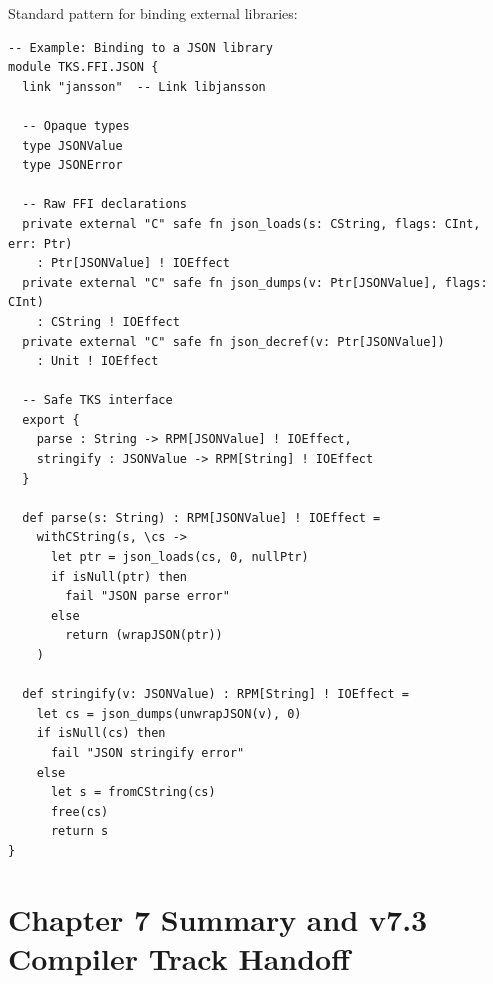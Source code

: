 \begin{definition}
\label{def:lib-binding-pattern}
Standard pattern for binding external libraries:
\begin{verbatim}
-- Example: Binding to a JSON library
module TKS.FFI.JSON {
  link "jansson"  -- Link libjansson

  -- Opaque types
  type JSONValue
  type JSONError

  -- Raw FFI declarations
  private external "C" safe fn json_loads(s: CString, flags: CInt, err: Ptr)
    : Ptr[JSONValue] ! IOEffect
  private external "C" safe fn json_dumps(v: Ptr[JSONValue], flags: CInt)
    : CString ! IOEffect
  private external "C" safe fn json_decref(v: Ptr[JSONValue])
    : Unit ! IOEffect

  -- Safe TKS interface
  export {
    parse : String -> RPM[JSONValue] ! IOEffect,
    stringify : JSONValue -> RPM[String] ! IOEffect
  }

  def parse(s: String) : RPM[JSONValue] ! IOEffect =
    withCString(s, \cs ->
      let ptr = json_loads(cs, 0, nullPtr)
      if isNull(ptr) then
        fail "JSON parse error"
      else
        return (wrapJSON(ptr))
    )

  def stringify(v: JSONValue) : RPM[String] ! IOEffect =
    let cs = json_dumps(unwrapJSON(v), 0)
    if isNull(cs) then
      fail "JSON stringify error"
    else
      let s = fromCString(cs)
      free(cs)
      return s
}
\end{verbatim}
\end{definition}

\section{Chapter 7 Summary and v7.3 Compiler Track Handoff}
\label{sec:compiler-handoff}

